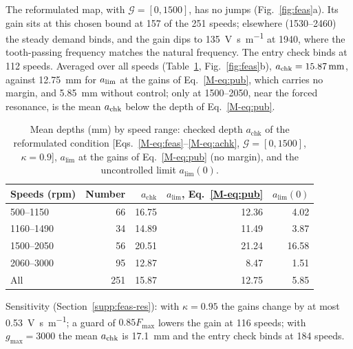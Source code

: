 The reformulated map, with $\mathcal G=[0,1500]$, has no jumps (Fig.~\ref{fig:feas}a). Its gain sits at this chosen bound at 157 of the 251 speeds; elsewhere (1530--\SI{2460}{\rpm}) the steady demand binds, and the gain dips to \SI{135}{\volt\second\per\metre} at \SI{1940}{\rpm}, where the tooth-passing frequency matches the natural frequency. The entry check binds at 112 speeds. Averaged over all speeds (Table~\ref{tab:feas}, Fig.~\ref{fig:feas}b), $a_{\mathrm{chk}}=\SI{15.87}{\milli\metre}$, against \SI{12.75}{\milli\metre} for $a_{\lim}$ at the gains of Eq.~\eqref{M-eq:pub}, which carries no margin, and \SI{5.85}{\milli\metre} without control; only at 1500--\SI{2050}{\rpm}, near the forced resonance, is the mean $a_{\mathrm{chk}}$ below the depth of Eq.~\eqref{M-eq:pub}.

\begin{table}[!tbp]
  \centering
  \caption{Mean depths (\si{\milli\metre}) by speed range: checked depth $a_{\mathrm{chk}}$ of the reformulated condition [Eqs.~\eqref{M-eq:feas}--\eqref{M-eq:achk}, $\mathcal G=[0,1500]$, $\kappa=0.9$], $a_{\lim}$ at the gains of Eq.~\eqref{M-eq:pub} (no margin), and the uncontrolled limit $a_{\lim}(0)$.}
  \label{tab:feas}
  \begin{tabular}{@{}lrrrr@{}}
    \toprule
    Speeds (rpm) & Number & $a_{\mathrm{chk}}$ & $a_{\lim}$, Eq.~\eqref{M-eq:pub} & $a_{\lim}(0)$\\
    \midrule
    500--1150  & 66  & 16.75 & 12.36 & 4.02\\
    1160--1490 & 34  & 14.89 & 11.49 & 3.87\\
    1500--2050 & 56  & 20.51 & 21.24 & 16.58\\
    2060--3000 & 95  & 12.87 & 8.47  & 1.51\\
    All        & 251 & 15.87 & 12.75 & 5.85\\
    \bottomrule
  \end{tabular}
  \par\smallskip
  \parbox{0.9\linewidth}{\footnotesize Sensitivity (Section~\ref{supp:feas-res}): with $\kappa=0.95$ the gains change by at most \SI{0.53}{\volt\second\per\metre}; a guard of $0.85F_{\max}$ lowers the gain at 116 speeds; with $g_{\max}=3000$ the mean $a_{\mathrm{chk}}$ is \SI{17.1}{\milli\metre} and the entry check binds at 184 speeds.}
\end{table}

